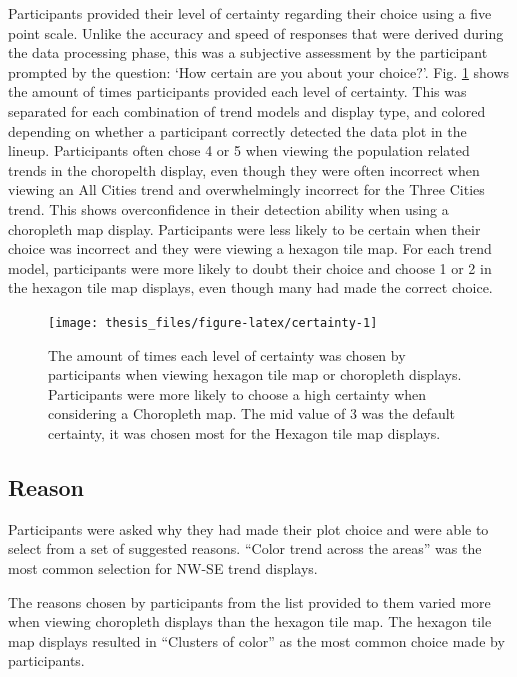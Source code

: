 \documentclass{monashthesis}
\begin{document}
Participants provided their level of certainty regarding their choice using a five point scale.
Unlike the accuracy and speed of responses that were derived during the data processing phase, this was a subjective
assessment by the participant prompted by the question: `How certain are you about your choice?'.
Fig. \ref{fig:certainty} shows the amount of times participants provided each level of certainty. This was separated for each combination of trend models and display type, and colored depending on whether a participant correctly detected the data plot in the lineup.
Participants often chose 4 or 5 when viewing the population related trends in the choropelth display, even though they were often incorrect when viewing an All Cities trend and overwhelmingly incorrect for the Three Cities trend. This shows overconfidence in their detection ability when using a choropleth map display. Participants were less likely to be certain when their choice was incorrect and they were viewing a hexagon tile map.
For each trend model, participants were more likely to doubt their choice and choose 1 or 2 in the hexagon tile map displays, even though many had made the correct choice.

\begin{figure}

{\centering \texttt{[image: thesis\_files/figure-latex/certainty-1]} 

}

\caption{The amount of times each level of certainty was chosen by participants when viewing hexagon tile map or choropleth displays. Participants were more likely to choose a high certainty when considering a Choropleth map. The mid value of 3 was the default certainty, it was chosen most for the Hexagon tile map displays.}\label{fig:certainty}
\end{figure}

\hypertarget{reason}{%
\subsection{Reason}\label{reason}}

Participants were asked why they had made their plot choice and were able to select from a set of suggested reasons.
``Color trend across the areas'' was the most common selection for NW-SE trend displays.

The reasons chosen by participants from the list provided to them varied more when viewing choropleth displays than the hexagon tile map.
The hexagon tile map displays resulted in ``Clusters of color'' as the most common choice made by participants.
\end{document}
